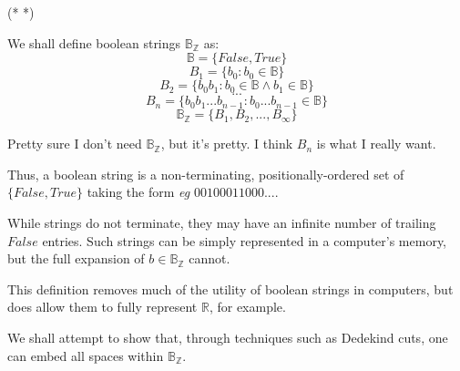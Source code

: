 \documentclass{article}
\begin{document}
(*  *)
\def\reals{\mathbb{R}}
\def\boolspace{\mathbb{B}}
\def\boolstring{\mathbb{B}_\mathbb{Z}}

We shall define boolean strings $\boolstring$ as:
\[\boolspace = \{False, True\}\]
\[B_1 = \{b_0 : b_0 \in \boolspace\}\]
\[B_2 = \{b_0 b_1 : b_0 \in \boolspace \wedge b_1 \in \boolspace\}\]
\[...\]
\[B_n = \{b_0 b_1 ... b_{n-1} : b_0 ... b_{n-1} \in \boolspace\}\]
\[\boolstring = \{B_1, B_2, ..., B_\infty\}\]

Pretty sure I don't need $\boolstring$, but it's pretty. I think $B_n$ is what I really want.

Thus, a boolean string is a non-terminating, positionally-ordered
set of $\{False, True\}$ taking the form \textit{eg} $00100011000....$

While strings do not terminate, they may have an infinite number of trailing $False$ entries.
Such strings can be simply represented in a computer's memory, but the full expansion of $b \in \boolstring$ cannot.

This definition removes much of the utility of boolean strings in computers, but does allow them to fully represent $\mathbb{R}$, for example.

We shall attempt to show that, through techniques such as Dedekind cuts, one can embed all spaces within $\boolstring$.
\end{document}

